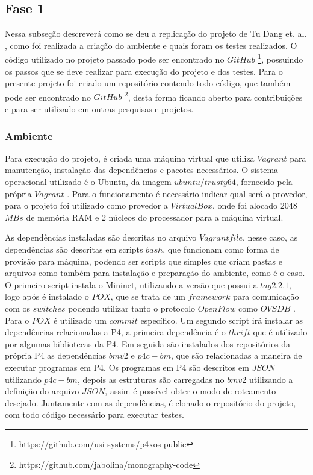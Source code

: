 \documentclass[12pt,
openright, 
oneside,
a4paper,
brazil]{facom-ufu-abntex2}
\theoremstyle{definition}
\begin{document}
\subsection{Fase 1}
Nessa subseção descreverá como se deu a replicação do projeto de Tu Dang et. al. 
\citep{dang2016paxos}, como foi realizada a criação do ambiente e quais foram os testes
realizados. O código utilizado no projeto passado pode ser encontrado no $GitHub$
\footnote{https://github.com/usi-systems/p4xos-public}, possuindo os passos que
se deve realizar para execução do projeto e dos testes. Para o presente projeto foi 
criado um repositório contendo todo código, que também pode ser encontrado no $GitHub$
\footnote{https://github.com/jabolina/monography-code}, desta forma ficando aberto
para contribuições e para ser utilizado em outras pesquisas e projetos.

\subsubsection{Ambiente}
Para execução do projeto, é criada uma máquina virtual que utiliza $Vagrant$ para
manutenção, instalação das dependências e pacotes necessários. O sistema operacional
utilizado é o Ubuntu, da imagem $ubuntu/trusty64$, fornecido pela própria
$Vagrant$ \citep{ubuntuTrusty}. Para o funcionamento é necessário indicar qual será
o provedor, para o projeto foi utilizado como provedor a $VirtualBox$, onde foi
alocado 2048 $MBs$ de memória RAM e 2 núcleos do processador para a máquina
virtual.

As dependências instaladas são descritas no arquivo $Vagrantfile$, nesse caso,
as dependências são descritas em scripts $bash$, que funcionam como forma
de provisão para máquina, podendo ser scripts que simples que criam pastas e arquivos
como também para instalação e preparação do ambiente, como é o caso. O primeiro script 
instala o Mininet, utilizando a versão que possui a $tag 2.2.1$, logo após é instalado 
o $POX$, que se trata de um $framework$ para comunicação com os $switches$ podendo 
utilizar tanto o protocolo $OpenFlow$  como $OVSDB$ \citep{poxWiki}. Para o $POX$ 
é utilizado um $commit$ específico. Um segundo script irá instalar as dependências 
relacionadas a P4, a primeira dependência é o $thrift$ que é utilizado por
algumas bibliotecas da P4. Em seguida são instalados dos repositórios da própria P4
as dependências $bmv2$ e $p4c-bm$, que são relacionadas a maneira de executar programas em P4.
Os programas em P4 são descritos em $JSON$ utilizando $p4c-bm$, depois as estruturas são 
carregadas no $bmv2$ utilizando a definição do arquivo $JSON$, assim é possível obter o modo
de roteamento desejado. Juntamente com as dependências, é clonado o repositório do projeto, 
com todo código necessário para executar testes.
\end{document}
